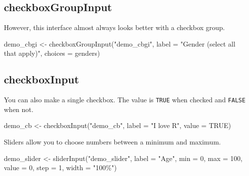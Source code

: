 \documentclass[
]{book}
\newenvironment{Shaded}{\begin{snugshade}}{\end{snugshade}}
\newcommand{\AttributeTok}[1]{\textcolor[rgb]{0.77,0.63,0.00}{#1}}
\newcommand{\ConstantTok}[1]{\textcolor[rgb]{0.00,0.00,0.00}{#1}}
\newcommand{\DecValTok}[1]{\textcolor[rgb]{0.00,0.00,0.81}{#1}}
\newcommand{\FunctionTok}[1]{\textcolor[rgb]{0.00,0.00,0.00}{#1}}
\newcommand{\NormalTok}[1]{#1}
\newcommand{\OtherTok}[1]{\textcolor[rgb]{0.56,0.35,0.01}{#1}}
\newcommand{\StringTok}[1]{\textcolor[rgb]{0.31,0.60,0.02}{#1}}
\begin{document}
\hypertarget{checkboxgroupinput}{%
\subsection{checkboxGroupInput}\label{checkboxgroupinput}}

However, this interface almost always looks better with a checkbox group.

\begin{Shaded}
\begin{Highlighting}[]
\NormalTok{demo\_cbgi }\OtherTok{\textless{}{-}}
  \FunctionTok{checkboxGroupInput}\NormalTok{(}\StringTok{"demo\_cbgi"}\NormalTok{,}
                     \AttributeTok{label =} \StringTok{"Gender (select all that apply)"}\NormalTok{,}
                     \AttributeTok{choices =}\NormalTok{ genders)}
\end{Highlighting}
\end{Shaded}

\hypertarget{checkboxinput}{%
\subsection{checkboxInput}\label{checkboxinput}}

You can also make a single checkbox. The value is \texttt{TRUE} when checked and \texttt{FALSE} when not.

\begin{Shaded}
\begin{Highlighting}[]
\NormalTok{demo\_cb }\OtherTok{\textless{}{-}} \FunctionTok{checkboxInput}\NormalTok{(}\StringTok{"demo\_cb"}\NormalTok{,}
                         \AttributeTok{label =} \StringTok{"I love R"}\NormalTok{,}
                         \AttributeTok{value =} \ConstantTok{TRUE}\NormalTok{)}
\end{Highlighting}
\end{Shaded}

Sliders allow you to choose numbers between a minimum and maximum.

\begin{Shaded}
\begin{Highlighting}[]
\NormalTok{demo\_slider }\OtherTok{\textless{}{-}} \FunctionTok{sliderInput}\NormalTok{(}\StringTok{"demo\_slider"}\NormalTok{,}
                           \AttributeTok{label =} \StringTok{"Age"}\NormalTok{,}
                           \AttributeTok{min =} \DecValTok{0}\NormalTok{,}
                           \AttributeTok{max =} \DecValTok{100}\NormalTok{,}
                           \AttributeTok{value =} \DecValTok{0}\NormalTok{,}
                           \AttributeTok{step =} \DecValTok{1}\NormalTok{,}
                           \AttributeTok{width =} \StringTok{"100\%"}\NormalTok{)}
\end{Highlighting}
\end{Shaded}
\end{document}
